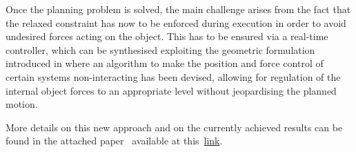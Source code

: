 Once the planning problem is solved, the main challenge arises from the fact that the relaxed constraint has now to be enforced during execution in order to avoid undesired forces acting on the object.
This has to be ensured via a real-time controller, which can be synthesised exploiting the geometric formulation introduced in \cite{prattichizzo1997consistent,prattichizzo1998dynamic} where an algorithm to make the position and force control of certain systems non-interacting has been devised, allowing for regulation of the internal object forces to an appropriate level without jeopardising the planned motion.

More details on this new approach and on the currently achieved results can be found in the attached paper~\cite{bonilla2015samplebased} available at this~\href{./attachedPapers/SampleBasedMotionPlanningSoftRobots.pdf}{link}. 